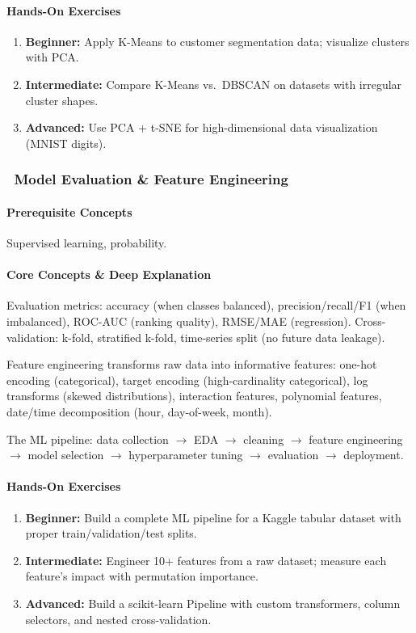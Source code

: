 \documentclass[11pt, a4paper, oneside]{report}
\newcommand{\mustmaster}[1]{\subsubsection{\texorpdfstring{\fcolorbox{blue!40!black}{blue!8}{\footnotesize\bfseries\color{blue!40!black} MUST MASTER}~#1}{#1}}}
\newcommand{\arrow}{$\rightarrow$}
\begin{document}
\paragraph{Hands-On Exercises}
\begin{enumerate}[leftmargin=*]
\item \textbf{Beginner:} Apply K-Means to customer segmentation data; visualize clusters with PCA.
\item \textbf{Intermediate:} Compare K-Means vs.\ DBSCAN on datasets with irregular cluster shapes.
\item \textbf{Advanced:} Use PCA + t-SNE for high-dimensional data visualization (MNIST digits).
\end{enumerate}

\mustmaster{Model Evaluation \& Feature Engineering}

\paragraph{Prerequisite Concepts} Supervised learning, probability.

\paragraph{Core Concepts \& Deep Explanation} Evaluation metrics: accuracy (when classes balanced), precision/recall/F1 (when imbalanced), ROC-AUC (ranking quality), RMSE/MAE (regression). Cross-validation: k-fold, stratified k-fold, time-series split (no future data leakage).

Feature engineering transforms raw data into informative features: one-hot encoding (categorical), target encoding (high-cardinality categorical), log transforms (skewed distributions), interaction features, polynomial features, date/time decomposition (hour, day-of-week, month).

The ML pipeline: data collection \arrow{} EDA \arrow{} cleaning \arrow{} feature engineering \arrow{} model selection \arrow{} hyperparameter tuning \arrow{} evaluation \arrow{} deployment.

\paragraph{Hands-On Exercises}
\begin{enumerate}[leftmargin=*]
\item \textbf{Beginner:} Build a complete ML pipeline for a Kaggle tabular dataset with proper train/validation/test splits.
\item \textbf{Intermediate:} Engineer 10+ features from a raw dataset; measure each feature's impact with permutation importance.
\item \textbf{Advanced:} Build a scikit-learn Pipeline with custom transformers, column selectors, and nested cross-validation.
\end{enumerate}
\end{document}
